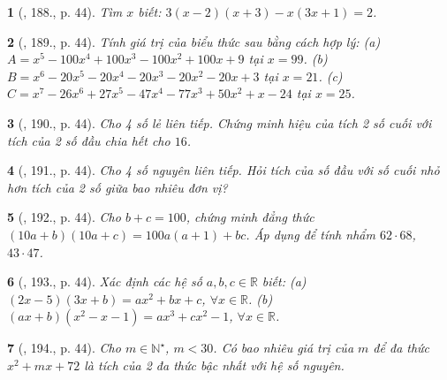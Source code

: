 \documentclass{article}
\newtheorem{baitoan}{}
\begin{document}
\begin{baitoan}[\cite{Tuyen_Toan_7}, 188., p. 44]
	Tìm $x$ biết: $3(x - 2)(x + 3) - x(3x + 1) = 2$.
\end{baitoan}

\begin{baitoan}[\cite{Tuyen_Toan_7}, 189., p. 44]
	Tính giá trị của biểu thức sau bằng cách hợp lý: (a) $A = x^5 - 100x^4 + 100x^3 - 100x^2 + 100x + 9$ tại $x = 99$. (b) $B = x^6 - 20x^5 - 20x^4 - 20x^3 - 20x^2 - 20x + 3$ tại $x = 21$. (c) $C = x^7 - 26x^6 + 27x^5 - 47x^4 - 77x^3 + 50x^2 + x - 24$ tại $x = 25$.
\end{baitoan}

\begin{baitoan}[\cite{Tuyen_Toan_7}, 190., p. 44]
	Cho 4 số lẻ liên tiếp. Chứng minh hiệu của tích 2 số cuối với tích của 2 số đầu chia hết cho $16$.
\end{baitoan}

\begin{baitoan}[\cite{Tuyen_Toan_7}, 191., p. 44]
	Cho 4 số nguyên liên tiếp. Hỏi tích của số đầu với số cuối nhỏ hơn tích của 2 số giữa bao nhiêu đơn vị?
\end{baitoan}

\begin{baitoan}[\cite{Tuyen_Toan_7}, 192., p. 44]
	Cho $b + c = 100$, chứng minh đẳng thức $(10a + b)(10a + c) = 100a(a + 1) + bc$. Áp dụng để tính nhẩm $62\cdot68$, $43\cdot47$.
\end{baitoan}

\begin{baitoan}[\cite{Tuyen_Toan_7}, 193., p. 44]
	Xác định các hệ số $a,b,c\in\mathbb{R}$ biết: (a) $(2x - 5)(3x + b) = ax^2 + bx + c$, $\forall x\in\mathbb{R}$. (b) $(ax + b)(x^2 - x - 1) = ax^3 + cx^2 - 1$, $\forall x\in\mathbb{R}$.
\end{baitoan}

\begin{baitoan}[\cite{Tuyen_Toan_7}, 194., p. 44]
	Cho $m\in\mathbb{N}^\star$, $m < 30$. Có bao nhiêu giá trị của $m$ để đa thức $x^2 + mx + 72$ là tích của 2 đa thức bậc nhất với hệ số nguyên.
\end{baitoan}

\end{document}

